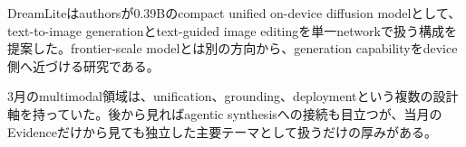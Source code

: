 DreamLiteはauthorsが0.39Bのcompact unified on-device diffusion modelとして、text-to-image generationとtext-guided image editingを単一networkで扱う構成を提案した。frontier-scale modelとは別の方向から、generation capabilityをdevice側へ近づける研究である。\autocite{src-b8369fd2c988}


3月のmultimodal領域は、unification、grounding、deploymentという複数の設計軸を持っていた。後から見ればagentic synthesisへの接続も目立つが、当月のEvidenceだけから見ても独立した主要テーマとして扱うだけの厚みがある。\autocite{src-197775677c0d,src-abece2adf5a7,src-ac36472a8f09,src-b8369fd2c988}


